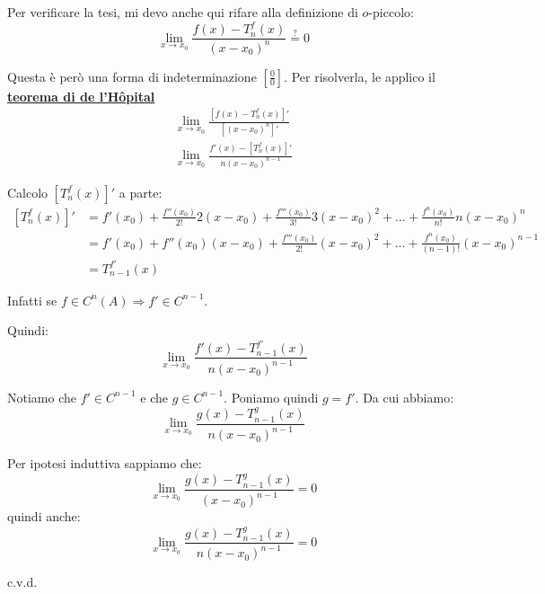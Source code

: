 \documentclass[../../analisi1]{subfiles}
\begin{document}
                Per verificare la tesi, mi devo anche qui rifare alla definizione di \(o\)-piccolo:
                \[\lim_{x \to x_0} \frac{f(x)-T _n ^ f (x)}{(x-x_0)^n} \stackrel{?}{=} 0\]

                Questa è però una forma di indeterminazione \(\left[\frac{0}{0}\right]\). Per risolverla, le applico il \textbf{\hyperref[teoHopital]{teorema di de l'Hôpital}}
                \begin{gather*}
                    \lim_{x \to x_0} \frac{\left[f(x)-T _n ^ f (x)\right]'}{\left[(x-x_0)^n\right]'}\\
                    \lim_{x \to x_0} \frac{f'(x)-\left[T _n ^ f (x)\right]'}{n(x-x_0)^{n-1}}
                \end{gather*}

                Calcolo \(\left[T _n ^ f (x)\right]'\) a parte:
                \begin{align*}
                    \left[T _n ^ f (x)\right]' &= f'(x_0) + \frac{f''(x_0)}{2!}2(x-x_0) + \frac{f'''(x_0)}{3!}3(x-x_0)^2 + \dots + \frac{f^n(x_0)}{n!}n(x-x_0)^n \\
                                            &= f'(x_0) + f''(x_0)(x-x_0) + \frac{f'''(x_0)}{2!}(x-x_0)^2 + \dots + \frac{f^n(x_0)}{(n-1)!}(x-x_0)^{n-1} \\
                                            &= T_{n-1} ^{f'} (x)
                \end{align*}

                Infatti se \(f \in C^n (A) \Rightarrow f' \in C^{n-1} \).

                Quindi:
                \[  \lim_{x \to x_0} \frac{f'(x)-T_{n-1} ^{f'} (x)}{n(x-x_0)^{n-1}}    \]

                Notiamo che \(f' \in C^{n-1}\) e che \(g \in C^{n-1}\). Poniamo quindi \(g = f'\). Da cui abbiamo:
                \[  \lim_{x \to x_0} \frac{g(x)-T_{n-1} ^{g} (x)}{n(x-x_0)^{n-1}}    \]

                Per ipotesi induttiva sappiamo che:
                \[  \lim_{x \to x_0} \frac{g(x) - T _{n - 1} ^ g (x)}{(x-x_0)^{n-1}} = 0 \]
                quindi anche:
                \[  \lim_{x \to x_0} \frac{g(x)-T_{n-1} ^{g} (x)}{n(x-x_0)^{n-1}}  = 0  \]

                c.v.d.
\end{document}
